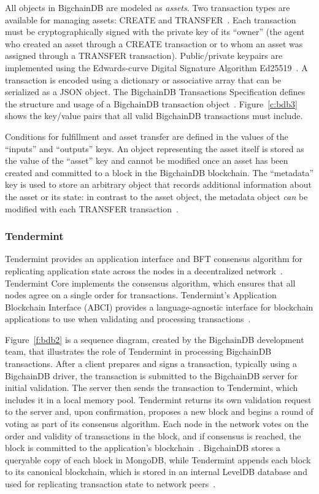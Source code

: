 All objects in BigchainDB are modeled as \emph{assets}. Two transaction types 
are available for managing assets: CREATE and TRANSFER~\cite{troyM18c}. Each 
transaction must be cryptographically signed with the private key of its 
``owner'' (the agent who created an asset through a CREATE transaction or to 
whom an asset was assigned through a TRANSFER transaction). Public/private 
keypairs are implemented using the Edwards-curve Digital Signature Algorithm 
Ed25519~\cite{troyM18c}. A transaction is encoded using a dictionary or 
associative array that can be serialized as a JSON object. The BigchainDB 
Transactions Specification defines the structure and usage of a BigchainDB 
transaction object~\cite{troyM18c}. Figure~\ref{c:bdb3} shows the key/value 
pairs that all valid BigchainDB transactions must include. 

Conditions for fulfillment and asset transfer are defined in the values
of the ``inputs'' and ``outputs'' keys. An object representing the asset
itself is stored as the value of the ``asset'' key and cannot be modified
once an asset has been created and committed to a block in the BigchainDB
blockchain. The ``metadata'' key is used to store an arbitrary object that
records additional information about the asset or its state: in contrast to
the asset object, the metadata object \emph{can} be modified with each
TRANSFER transaction~\cite{troyM18c}.

\subsubsection{Tendermint}
Tendermint provides an application interface and BFT consensus
algorithm for replicating application state across the nodes in a
decentralized network~\cite{tender18}. Tendermint Core implements the
consensus algorithm, which ensures that all nodes agree on a single order
for transactions. Tendermint's Application Blockchain Interface (ABCI)
provides a language-agnostic interface for blockchain applications to use
when validating and processing transactions~\cite{tender18}.

Figure~\ref{f:bdb2} is a sequence diagram, created by the BigchainDB
development team, that illustrates the role of Tendermint in processing
BigchainDB transactions. After a client prepares and signs a transaction,
typically using a BigchainDB driver, the transaction is submitted to the
BigchainDB server for initial validation. The server then sends the
transaction to Tendermint, which includes it in a local memory pool.
Tendermint returns its own validation request to the server and, upon
confirmation, proposes a new block and begins a round of voting as part of
its consensus algorithm. Each node in the network votes on the order and
validity of transactions in the block, and if consensus is reached, the
block is committed to the application's blockchain~\cite{gautam18, bigDB18}.
BigchainDB stores a queryable copy of each block in MongoDB, while
Tendermint appends each block to its canonical blockchain, which is stored
in an internal LevelDB database and used for replicating transaction state
to network peers~\cite{tender18, bigDB18}.

